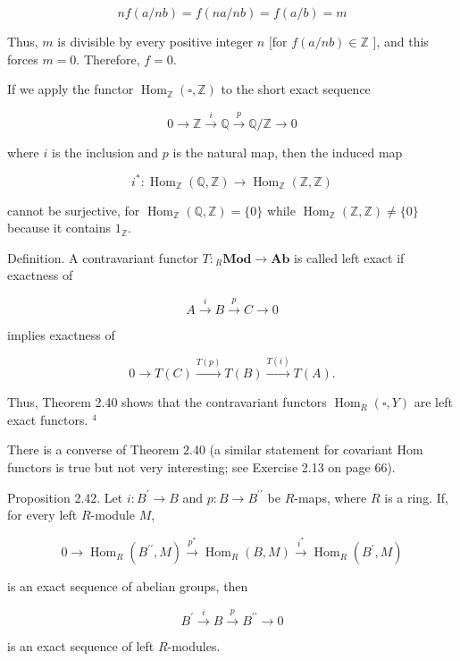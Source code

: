 \documentclass[10pt]{article}
\begin{document}
$$
n f(a / n b)=f(n a / n b)=f(a / b)=m
$$

Thus, $m$ is divisible by every positive integer $n$ [for $f(a / n b) \in \mathbb{Z}$ ], and this forces $m=0$. Therefore, $f=0$.

If we apply the functor $\operatorname{Hom}_{\mathbb{Z}}(\square, \mathbb{Z})$ to the short exact sequence

$$
0 \rightarrow \mathbb{Z} \xrightarrow{i} \mathbb{Q} \xrightarrow{p} \mathbb{Q} / \mathbb{Z} \rightarrow 0
$$

where $i$ is the inclusion and $p$ is the natural map, then the induced map

$$
i^{*}: \operatorname{Hom}_{\mathbb{Z}}(\mathbb{Q}, \mathbb{Z}) \rightarrow \operatorname{Hom}_{\mathbb{Z}}(\mathbb{Z}, \mathbb{Z})
$$

cannot be surjective, for $\operatorname{Hom}_{\mathbb{Z}}(\mathbb{Q}, \mathbb{Z})=\{0\}$ while $\operatorname{Hom}_{\mathbb{Z}}(\mathbb{Z}, \mathbb{Z}) \neq\{0\}$ because it contains $1_{\mathbb{Z}}$.

Definition. A contravariant functor $T:{ }_{R} \mathbf{M o d} \rightarrow \mathbf{A b}$ is called left exact if exactness of

$$
A \xrightarrow{i} B \xrightarrow{p} C \rightarrow 0
$$

implies exactness of

$$
0 \rightarrow T(C) \xrightarrow{T(p)} T(B) \xrightarrow{T(i)} T(A) .
$$

Thus, Theorem 2.40 shows that the contravariant functors $\operatorname{Hom}_{R}(\square, Y)$ are left exact functors. ${ }^{4}$

There is a converse of Theorem 2.40 (a similar statement for covariant Hom functors is true but not very interesting; see Exercise 2.13 on page 66).

Proposition 2.42. Let $i: B^{\prime} \rightarrow B$ and $p: B \rightarrow B^{\prime \prime}$ be $R$-maps, where $R$ is a ring. If, for every left $R$-module $M$,

$$
0 \rightarrow \operatorname{Hom}_{R}\left(B^{\prime \prime}, M\right) \xrightarrow{p^{*}} \operatorname{Hom}_{R}(B, M) \xrightarrow{i^{*}} \operatorname{Hom}_{R}\left(B^{\prime}, M\right)
$$

is an exact sequence of abelian groups, then

$$
B^{\prime} \xrightarrow{i} B \xrightarrow{p} B^{\prime \prime} \rightarrow 0
$$

is an exact sequence of left $R$-modules.
\end{document}
